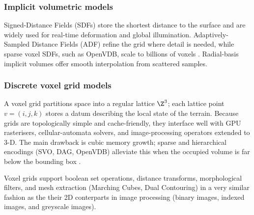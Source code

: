 \subsubsection{Implicit volumetric models}
    
Signed-Distance Fields (SDFs) store the shortest distance to the surface and are widely used for real-time deformation and global illumination. Adaptively-Sampled Distance Fields (ADF) refine the grid where detail is needed, while sparse voxel SDFs, such as OpenVDB, scale to billions of voxels \cite{Frisken2000,Museth2013}. Radial-basis implicit volumes offer smooth interpolation from scattered samples.

\subsubsection{Discrete voxel grid models}
A voxel grid partitions space into a regular lattice $\Z^{3}$; each lattice point $v=(i,j,k)$ stores a datum describing the local state of the terrain. Because grids are topologically simple and cache-friendly, they interface well with GPU rasterisers, cellular-automata solvers, and image-processing operators extended to 3-D. The main drawback is cubic memory growth; sparse and hierarchical encodings (SVO, DAG, OpenVDB) alleviate this when the occupied volume is far below the bounding box
\cite{Laine2010,Villanueva2017,Museth2013}.

Voxel grids support boolean set operations, distance transforms, morphological filters, and mesh extraction (Marching Cubes, Dual Contouring) in a very similar fashion as the their 2D conterparts in image processing (binary images, indexed images, and greyscale images).

